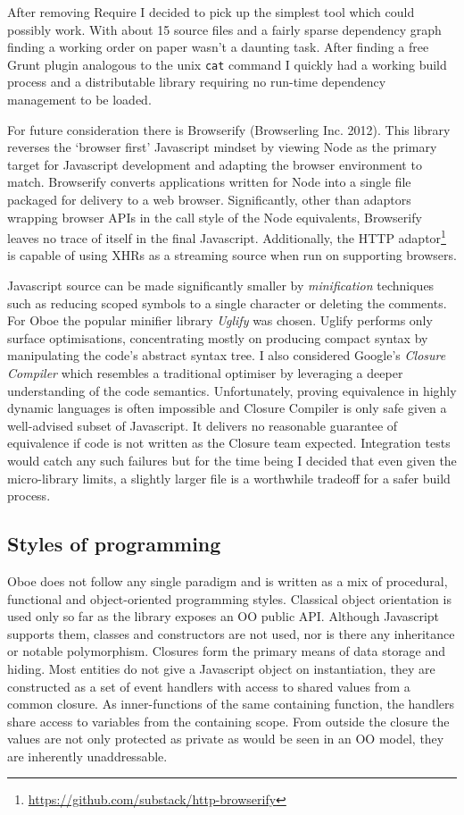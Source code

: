 \documentclass[12pt, ]{article}
\begin{document}
After removing Require I decided to pick up the simplest tool which
could possibly work. With about 15 source files and a fairly sparse
dependency graph finding a working order on paper wasn't a daunting
task. After finding a free Grunt plugin analogous to the unix
\texttt{cat} command I quickly had a working build process and a
distributable library requiring no run-time dependency management to be
loaded.

For future consideration there is Browserify (Browserling Inc. 2012).
This library reverses the `browser first' Javascript mindset by viewing
Node as the primary target for Javascript development and adapting the
browser environment to match. Browserify converts applications written
for Node into a single file packaged for delivery to a web browser.
Significantly, other than adaptors wrapping browser APIs in the call
style of the Node equivalents, Browserify leaves no trace of itself in
the final Javascript. Additionally, the HTTP adaptor\footnote{\url{https://github.com/substack/http-browserify}}
is capable of using XHRs as a streaming source when run on supporting
browsers.

Javascript source can be made significantly smaller by
\emph{minification} techniques such as reducing scoped symbols to a
single character or deleting the comments. For Oboe the popular minifier
library \emph{Uglify} was chosen. Uglify performs only surface
optimisations, concentrating mostly on producing compact syntax by
manipulating the code's abstract syntax tree. I also considered Google's
\emph{Closure Compiler} which resembles a traditional optimiser by
leveraging a deeper understanding of the code semantics. Unfortunately,
proving equivalence in highly dynamic languages is often impossible and
Closure Compiler is only safe given a well-advised subset of Javascript.
It delivers no reasonable guarantee of equivalence if code is not
written as the Closure team expected. Integration tests would catch any
such failures but for the time being I decided that even given the
micro-library limits, a slightly larger file is a worthwhile tradeoff
for a safer build process.

\subsection{Styles of programming}\label{styles-of-programming}

Oboe does not follow any single paradigm and is written as a mix of
procedural, functional and object-oriented programming styles. Classical
object orientation is used only so far as the library exposes an OO
public API. Although Javascript supports them, classes and constructors
are not used, nor is there any inheritance or notable polymorphism.
Closures form the primary means of data storage and hiding. Most
entities do not give a Javascript object on instantiation, they are
constructed as a set of event handlers with access to shared values from
a common closure. As inner-functions of the same containing function,
the handlers share access to variables from the containing scope. From
outside the closure the values are not only protected as private as
would be seen in an OO model, they are inherently unaddressable.
\end{document}
